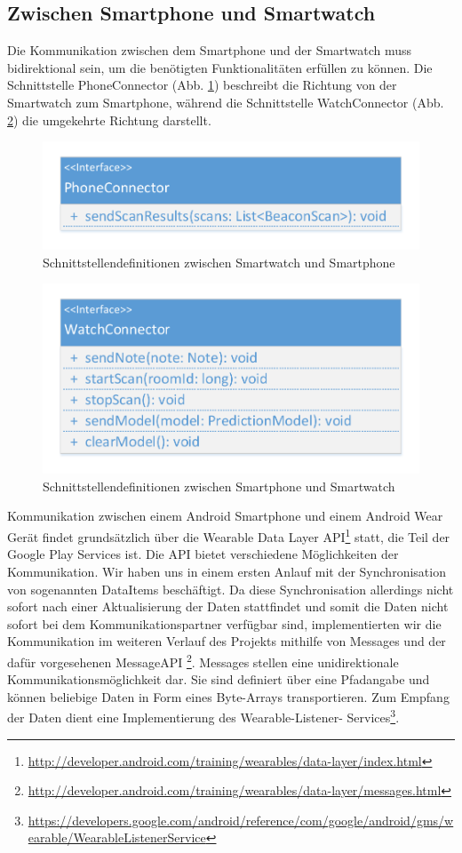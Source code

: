 \subsection{Zwischen Smartphone und Smartwatch}
Die Kommunikation zwischen dem Smartphone und der Smartwatch muss bidirektional sein, um die benötigten Funktionalitäten erfüllen zu können. Die Schnittstelle PhoneConnector (Abb. \ref{fig:KlassendiagrammePhone}) beschreibt die Richtung von der Smartwatch zum Smartphone, während die Schnittstelle WatchConnector (Abb. \ref{fig:KlassendiagrammeWatch}) die umgekehrte Richtung darstellt.

\begin{figure}[H]
\centering
\includegraphics[width=0.5\linewidth]{../Bilder/KlassendiagrammePhone}
\caption{Schnittstellendefinitionen zwischen Smartwatch und Smartphone}
\label{fig:KlassendiagrammePhone}
\end{figure}

\begin{figure}[H]
\centering
\includegraphics[width=0.5\linewidth]{../Bilder/KlassendiagrammeWatch}
\caption{Schnittstellendefinitionen zwischen Smartphone und Smartwatch}
\label{fig:KlassendiagrammeWatch}
\end{figure}

Kommunikation zwischen einem Android Smartphone und einem Android Wear Gerät findet grundsätzlich über die Wearable Data Layer API\footnote{\url{http://developer.android.com/training/wearables/data-layer/index.html}} statt, die Teil der Google Play Services ist. Die API bietet verschiedene Möglichkeiten der Kommunikation. Wir haben uns in einem ersten Anlauf mit der Synchronisation von sogenannten DataItems beschäftigt. Da diese Synchronisation allerdings nicht sofort nach einer Aktualisierung der Daten stattfindet und somit die Daten nicht sofort bei dem Kommunikationspartner verfügbar sind, implementierten wir die Kommunikation im weiteren Verlauf des Projekts mithilfe von Messages und der dafür vorgesehenen MessageAPI \footnote{\url{http://developer.android.com/training/wearables/data-layer/messages.html}}. Messages stellen eine unidirektionale Kommunikationsmöglichkeit dar. Sie sind definiert über eine Pfadangabe und können beliebige Daten in Form eines Byte-Arrays transportieren. Zum Empfang der Daten dient eine Implementierung des Wearable-Listener- Services\footnote{\url{https://developers.google.com/android/reference/com/google/android/gms/wearable/WearableListenerService}}.

